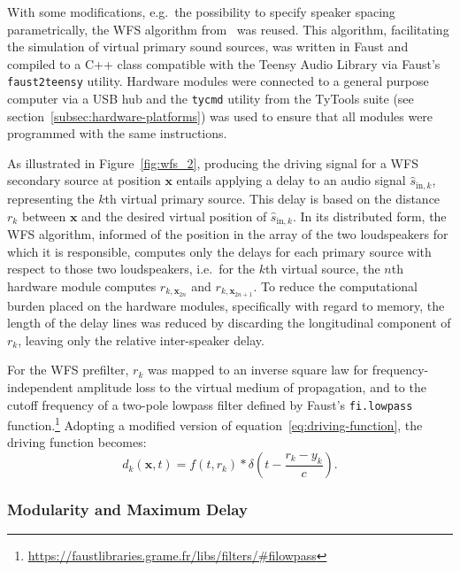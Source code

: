 \documentclass[utf8]{FrontiersinHarvard}
\newcommand{\figref}[1]{Figure~\ref{#1}}
\newcommand{\secref}[1]{section~\ref{#1}}
\newcommand{\bfx}{\mathbf{x}}
\newcommand{\sigink}{\hat{s}_{\text{in},k}}
\begin{document}
    With some modifications, e.g.\ the possibility to specify speaker spacing
    parametrically, the WFS algorithm
    from~\citep{rushton_microcontroller-based_2023} was reused.
    This algorithm, facilitating the simulation of virtual primary sound
    sources, was written in Faust and compiled to a C++ class compatible with
    the Teensy Audio Library via Faust's \texttt{faust2teensy} utility.
    Hardware modules were connected to a general purpose computer via a USB hub
    and the \texttt{tycmd} utility from the TyTools suite (see
    \secref{subsec:hardware-platforms}) was used to ensure that all modules were
    programmed with the same instructions.

    As illustrated in \figref{fig:wfs_2}, producing the driving signal for a WFS
    secondary source at position $\mathbf{x}$ entails applying a delay to an audio
    signal $\sigink$, representing the $k$th virtual primary source.
    This delay is based on the distance $r_k$ between $\mathbf{x}$ and the
    desired virtual position of $\sigink$.
    In its distributed form, the WFS algorithm, informed of the position in the
    array of the two loudspeakers for which it is responsible, computes only the
    delays for each primary source with respect to those two loudspeakers, i.e.\
    for the $k$th virtual source, the $n$th hardware module computes
    $r_{k,\mathbf{x}_{2n}}$ and $r_{k,\mathbf{x}_{2n+1}}$.
    To reduce the computational burden placed on the hardware modules, specifically
    with regard to memory, the length of the delay lines was reduced by discarding
    the longitudinal component of $r_k$, leaving only the relative inter-speaker
    delay.

    For the WFS prefilter, $r_k$ was mapped to an inverse square law for
    frequency-independent amplitude loss to the virtual medium of propagation, and
    to the cutoff frequency of a two-pole lowpass filter defined by Faust's
    \texttt{fi.lowpass} function.\footnote{
        \url{https://faustlibraries.grame.fr/libs/filters/\#filowpass}
    }
    Adopting a modified version of equation~\eqref{eq:driving-function}, the
    driving function becomes:
    \begin{equation}
        \label{eq:simple-driving-function}
        d_k(\bfx,t) = f(t, r_k) \ast \delta\left(t - \frac{r_k-y_k}{c}\right).
    \end{equation}

    \subsubsection{Modularity and Maximum Delay}
\end{document}
